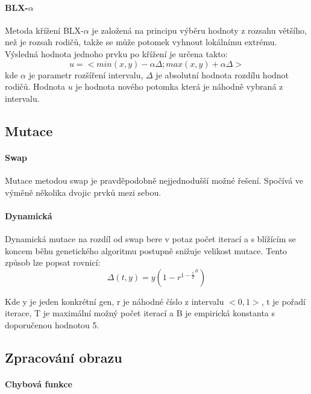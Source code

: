 \documentclass[a4paper,11pt,titlepage]{scrartcl}
\begin{document}
\paragraph{BLX-$\alpha$}
Metoda křížení BLX-$\alpha$ \cite{blx} je založená na principu výběru hodnoty z rozsahu většího, než je rozsah rodičů, takže se může potomek vyhnout lokálnímu extrému.\\
Výsledná hodnota jednoho prvku po křížení je určena takto:
\begin{equation}
    u = <min(x,y) - \alpha \Delta; max(x,y) + \alpha \Delta>
\end{equation}
kde $\alpha$ je parametr rozšíření intervalu, $\Delta$ je absolutní hodnota rozdílu hodnot rodičů. Hodnota $u$ je hodnota nového potomka která je náhodně vybraná z intervalu.

\subsection{Mutace}

\paragraph{Swap}
Mutace metodou swap je pravděpodobně nejjednodušší možné řešení. Spočívá ve výměně několika dvojic prvků mezi sebou.

\paragraph{Dynamická}
Dynamická mutace na rozdíl od swap bere v potaz počet iterací a s blížícím se koncem běhu genetického algoritmu postupně snižuje velikost mutace. Tento způsob lze popsat rovnicí:
\begin{equation}
    \Delta(t,y) = y \left( 1 - r^{ {1-\frac{t}{T} }^B }  \right)
\end{equation}

Kde y je jeden konkrétní gen, r je náhodné číslo z intervalu $ <0,1> $, t je pořadí iterace, T je maximální možný počet iterací a B je empirická konstanta s doporučenou hodnotou 5.

\subsection{Zpracování obrazu}

\paragraph{Chybová funkce}
\end{document}
